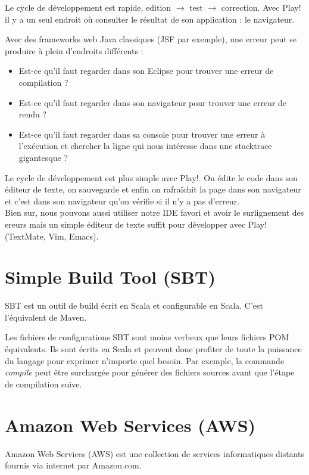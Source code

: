 Le cycle de développement est rapide, edition $\rightarrow$ test $\rightarrow$ correction.
Avec Play! il y a un seul endroit où consulter le résultat de son
application : le navigateur. 

Avec des frameworks web Java classiques (JSF par exemple), une erreur peut se
produire à plein d'endroits différents :
\begin{itemize}
\item Est-ce qu'il faut regarder dans son Eclipse pour trouver une erreur de
  compilation ?
\item Est-ce qu'il faut regarder dans son navigateur pour trouver une erreur de
  rendu ?
\item Est-ce qu'il faut regarder dans sa console pour trouver une erreur à
  l'exécution et chercher la ligne qui nous intéresse dans une stacktrace
  gigantesque ? 
\end{itemize}

\bigskip

Le cycle de développement est plus simple avec Play!.
On édite le code dans son éditeur de texte, on sauvegarde et enfin on rafraîchit
la page dans son navigateur et c'est dans son navigateur qu'on vérifie si il n'y
a pas d'erreur. \\
Bien sur, nous pouvons aussi utiliser notre IDE favori et avoir le
surlignement des ereurs mais un simple éditeur de texte suffit pour développer
avec Play! (TextMate, Vim, Emacs).

\section{Simple Build Tool (SBT)}

SBT est un outil de build écrit en Scala et configurable en Scala.
C'est l'équivalent de Maven.  

Les fichiers de configurations SBT sont moins verbeux que leurs fichiers POM
équivalents. Ils sont écrits en Scala et peuvent donc profiter de toute la
puissance du langage pour exprimer n'importe quel besoin. Par exemple, 
la commande \textit{compile} peut être surchargée pour générer des fichiers sources avant
que l'étape de compilation suive.

\section{Amazon Web Services (AWS)}

Amazon Web Services (AWS) est une collection de services informatiques distants
 fournis via internet par Amazon.com.

